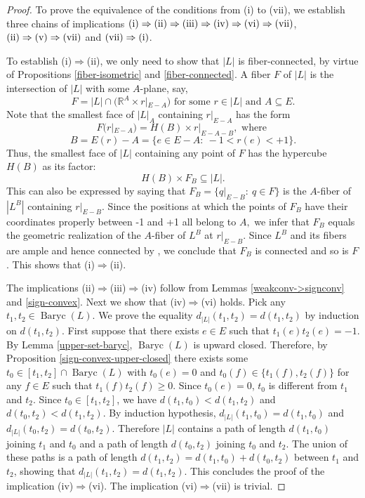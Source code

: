 \documentclass[11pt,a4paper]{amsart}
\theoremstyle{definition}
\numberwithin{equation}{section}
\DeclareMathOperator{\Baryc}{Baryc}
\newcommand{\covectors}{\ensuremath{L}}
\newcommand{\HH}{\ensuremath{H}}
\newcommand{\FF}{\ensuremath{F}}
\begin{document}
\begin{proof} To prove the equivalence of the conditions from (i) to (vii), we establish three chains of implications $\rm(i)\Rightarrow \rm(ii)\Rightarrow \rm(iii)\Rightarrow \rm(iv)\Rightarrow \rm(vi)\Rightarrow \rm(vii)$,  $\rm(ii)\Rightarrow \rm(v)\Rightarrow \rm(vii)$ and $\rm{(vii)}\Rightarrow \rm(i)$.

To establish (i)$\Rightarrow$(ii), we only need to show that $|\covectors|$ is fiber-connected, by virtue of Propositions  \ref{fiber-isometric} and \ref{fiber-connected}. A fiber $\FF$ of $|\covectors|$ is the intersection of $|\covectors|$ with some $A$-plane, say,
$${\FF}= |\covectors|\cap ({\mathbb R}^A \times r|_{E-A}) \mbox{ for some } r\in |\covectors| \mbox{ and } A\subseteq E.$$
Note that the smallest face of $|\covectors|_A$ containing $r|_{E-A}$ has the form
$$F(r|_{E-A})=\HH(B) \times r|_{E-A-B}, \mbox{ where }$$
$$B=E(r)-A=\{ e\in E-A: ~-1<r(e)<+1\}.$$
Thus, the smallest face of $|\covectors|$ containing any point of $\FF$ has the hypercube $\HH(B)$  as its factor:
$$\HH(B) \times {\FF}_B\subseteq |\covectors|.$$
This can also be expressed by saying that ${\FF}_B=\{ q|_{E-B}: ~q\in {\FF}\}$ is the $A$-fiber of $|\covectors^B|$ containing $r|_{E-B}.$ Since the positions at
which the points of ${\FF}_B$ have their coordinates properly between -1 and +1 all belong to $A,$ we infer that ${\FF}_B$ equals the geometric realization
of the $A$-fiber of $\covectors^B$ at $r|_{E-B}.$ Since $\covectors^B$ and its fibers are ample and hence connected by \cite[Theorem 3]{BaChDrKo}, we conclude that ${\FF}_B$
is connected and so is $\FF$. This shows that  (i)$\Rightarrow$(ii).

The implications  (ii)$\Rightarrow$(iii)$\Rightarrow$(iv) follow  from Lemmas \ref{weakconv->signconv}  and \ref{sign-convex}. Next we show that (iv)$\Rightarrow$(vi) holds. Pick any $t_1,t_2\in \Baryc(\covectors)$. We prove the equality $d_{|L|}(t_1,t_2)=d(t_1,t_2)$ by induction on $d(t_1,t_2)$. First suppose that there exists $e\in E$ such that $t_1(e)t_2(e)=-1$. By Lemma \ref{upper-set-baryc}, $\Baryc(\covectors)$ is upward closed. Therefore, by Proposition \ref{sign-convex-upper-closed}  there exists some $t_0\in [t_1,t_2]\cap \Baryc(\covectors)$ with $t_0(e)=0$ and $t_0(f)\in \{ t_1(f),t_2(f)\}$ for any $f\in E$ such that $t_1(f)t_2(f)\ge 0$. Since $t_0(e)=0$, $t_0$ is different from $t_1$ and $t_2$. Since $t_0\in [t_1,t_2]$, we have $d(t_1,t_0)<d(t_1,t_2)$ and $d(t_0,t_2)<d(t_1,t_2)$. By induction hypothesis, $d_{|L|}(t_1,t_0)=d(t_1,t_0)$ and $d_{|L|}(t_0,t_2)=d(t_0,t_2)$. Therefore $|L|$ contains a path of length $d(t_1,t_0)$ joining $t_1$ and $t_0$ and a path of length $d(t_0,t_2)$ joining $t_0$ and $t_2$. The union of these paths is a path of length $d(t_1,t_2)=d(t_1,t_0)+d(t_0,t_2)$ between $t_1$ and $t_2$, showing that $d_{|L|}(t_1,t_2)=d(t_1,t_2)$. This concludes the proof of the implication  (iv)$\Rightarrow$(vi).  The implication %
(vi)$\Rightarrow$(vii) is trivial.


\end{proof}
\end{document}
